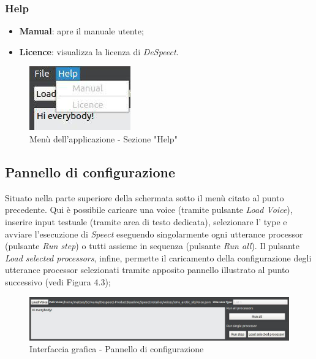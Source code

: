 \documentclass[openany,12pt,a4paper]{report}
\begin{document}
 	\subsubsection{Help}
 		\begin{itemize}
 			\item \textbf{Manual}: apre il manuale utente;
 			\item \textbf{Licence}: visualizza la licenza di \textit{DeSpeect}.
 		\end{itemize}
 		\begin{figure}[H]
 			
 			\centering
 			
 			\includegraphics[width=.4\textwidth]{./img/menu_help}
 			
 			\caption{Menù dell'applicazione - Sezione "Help"}
 			
 		\end{figure}
 	
 	\subsection{Pannello di configurazione}
 	Situato nella parte superiore della schermata sotto il menù citato al punto precedente. Qui è possibile caricare una voice (tramite pulsante \textit{Load Voice}), inserire input testuale (tramite area di testo dedicata), selezionare l' type e avviare l'esecuzione di \textit{Speect} eseguendo singolarmente ogni utterance processor (pulsante \textit{Run step}) o tutti assieme in sequenza (pulsante \textit{Run all}). Il pulsante \textit{Load selected processors}, infine, permette il caricamento della configurazione degli utterance processor selezionati tramite apposito pannello illustrato al punto successivo (vedi Figura 4.3);
 		\begin{figure}[H]
 			
 			\centering
 			
 			\includegraphics[width=\textwidth]{./img/pannello_configurazione}
 			
 			\caption{Interfaccia grafica - Pannello di configurazione}
 			
 		\end{figure}
 	
\end{document}

